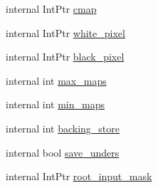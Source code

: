 \begin{DoxyCompactItemize}
\item 
internal IntPtr \hyperlink{struct_tao_1_1_platform_1_1_x11_1_1_x_screen_a675f385bf9040753d412dec9e18e71a8}{cmap}
\item 
internal IntPtr \hyperlink{struct_tao_1_1_platform_1_1_x11_1_1_x_screen_a81b6434ac283722f73f5fc94e83df733}{white\_\-pixel}
\item 
internal IntPtr \hyperlink{struct_tao_1_1_platform_1_1_x11_1_1_x_screen_abb888f301eea38ae4782277cd7318775}{black\_\-pixel}
\item 
internal int \hyperlink{struct_tao_1_1_platform_1_1_x11_1_1_x_screen_a922563955091d61eeca64c6edd678974}{max\_\-maps}
\item 
internal int \hyperlink{struct_tao_1_1_platform_1_1_x11_1_1_x_screen_ae6e8f60157cf773fd632b8765e52d8c3}{min\_\-maps}
\item 
internal int \hyperlink{struct_tao_1_1_platform_1_1_x11_1_1_x_screen_ab306d8dd194f4c73ada5ae79beac2bd2}{backing\_\-store}
\item 
internal bool \hyperlink{struct_tao_1_1_platform_1_1_x11_1_1_x_screen_a9100f827678759204333781fedeed48c}{save\_\-unders}
\item 
internal IntPtr \hyperlink{struct_tao_1_1_platform_1_1_x11_1_1_x_screen_ac7bf0591a0a753a688dc3a0cbf647254}{root\_\-input\_\-mask}
\end{DoxyCompactItemize}



